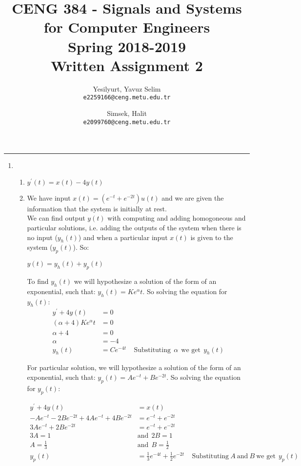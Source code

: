 \documentclass[10pt,a4paper, margin=1in]{article}
\author{
  Yesilyurt, Yavuz Selim\\
  \texttt{e2259166@ceng.metu.edu.tr}
  \and
   Simsek, Halit\\
  \texttt{e2099760@ceng.metu.edu.tr}
}
\title{CENG 384 - Signals and Systems for Computer Engineers \\
Spring 2018-2019 \\
Written Assignment 2}
\begin{document}
\maketitle

\noindent\rule{19cm}{1.2pt}

\begin{enumerate}

\item 
    \begin{enumerate}
    \item
    $y^{'}(t)=x(t) - 4y(t)$ \\
    \item
    We have input $x(t)=(e^{-t}+e^{-2t})u(t)$ and we are given the information that the system is initially at rest. \\
    
    We can find output $y(t)$ with computing and adding homogoneous and particular solutions, i.e. adding the outputs of the system when there is no input ($y_h(t)$) and when a particular input $x(t)$ is given to the system ($y_p(t)$). So: 
	\begin{center}
	$y(t)=y_h(t)+y_p(t)$ 
	\end{center}
	
	To find $y_h(t)$ we will hypothesize a solution of the form of an exponential, such that: $y_h(t) = Ke^{\alpha}t$. So solving the equation for $y_h(t)$: 
	\begin{align*}
	y^{'}+4y(t)&=0 \\
	(\alpha+4)Ke^{\alpha}t&=0 \\
	\alpha + 4 &= 0 \\
	\alpha &= -4  \\
	y_h(t)&=Ce^{-4t} \ \ \ \ \ \text{Substituting} \ \ \alpha \ \ \text{we get} \ \ y_h(t)
	\end{align*}
	
	For particular solution, we will hypothesize a solution of the form of an exponential, such that: $y_p(t) = Ae^{-t}+Be^{-2t}$. So solving the equation for $y_p(t)$:
	
	\begin{align*}
	y^{'}+4y(t)&=x(t) \\
	-Ae^{-t}-2Be^{-2t}+4Ae^{-t}+4Be^{-2t}&=e^{-t}+e^{-2t}\\
	3Ae^{-t}+2Be^{-2t} &= e^{-t}+e^{-2t} \\
	3A = 1 \ \ &\text{and} \ \ 2B = 1 \\
	A = \frac{1}{3} \ \ &\text{and} \ \ B = \frac{1}{2}\\
	y_p(t)&=\frac{1}{3}e^{-4t} + \frac{1}{2}e^{-2t} \ \ \ \ \ \text{Substituting} \ A \ \text{and} \ B \ \text{we get} \ \ y_p(t)
	\end{align*}
	

\end{enumerate}
\end{enumerate}
\end{document}

